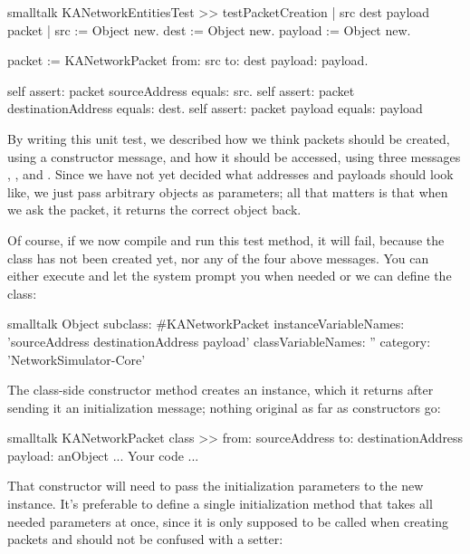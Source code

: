 \documentclass[10pt,twoside,english]{_support/latex/sbabook/sbabook}
\begin{document}
\begin{displaycode}{smalltalk}
KANetworkEntitiesTest >> testPacketCreation
    | src dest payload packet |
    src := Object new.
    dest := Object new.
    payload := Object new.

    packet := KANetworkPacket from: src to: dest payload: payload.

    self assert: packet sourceAddress equals: src.
    self assert: packet destinationAddress equals: dest.
    self assert: packet payload equals: payload
\end{displaycode}

By writing this unit test, we described how we think packets should be created, using a  constructor message, and how it should be accessed, using three messages , , and .
Since we have not yet decided what addresses and payloads should look like, we just pass arbitrary objects as parameters; all that matters is that when we ask the packet, it returns the correct object back.

Of course, if we now compile and run this test method, it will fail, because the class  has not been created yet, nor any of the four above messages.
You can either execute and let the system prompt you when needed or we can define the class:

\begin{displaycode}{smalltalk}
Object subclass: #KANetworkPacket
    instanceVariableNames: 'sourceAddress destinationAddress payload'
    classVariableNames: ''
    category: 'NetworkSimulator-Core'
\end{displaycode}

The class-side constructor method creates an instance, which it returns after sending it an initialization message; nothing original as far as constructors go:

\begin{displaycode}{smalltalk}
KANetworkPacket class >> from: sourceAddress to: destinationAddress payload: anObject
    ... Your code ...
\end{displaycode}

That constructor will need to pass the initialization parameters to the new instance.
It's preferable to define a single initialization method that takes all needed parameters at once, since it is only supposed to be called when creating packets and should not be confused with a setter:
\end{document}
